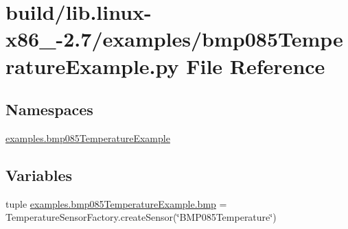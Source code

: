 \hypertarget{build_2lib_8linux-x86__64-2_87_2examples_2bmp085TemperatureExample_8py}{}\section{build/lib.linux-\/x86\+\_-\/2.7/examples/bmp085\+Temperature\+Example.py File Reference}
\label{build_2lib_8linux-x86__64-2_87_2examples_2bmp085TemperatureExample_8py}
\subsection*{Namespaces}
\begin{DoxyCompactItemize}
\item 
 \hyperlink{namespaceexamples_1_1bmp085TemperatureExample}{examples.\+bmp085\+Temperature\+Example}
\end{DoxyCompactItemize}
\subsection*{Variables}
\begin{DoxyCompactItemize}
\item 
tuple \hyperlink{namespaceexamples_1_1bmp085TemperatureExample_aee3e90190394ffede28fce79de67a10f}{examples.\+bmp085\+Temperature\+Example.\+bmp} = Temperature\+Sensor\+Factory.\+create\+Sensor(\char`\"{}B\+M\+P085\+Temperature\char`\"{})
\end{DoxyCompactItemize}
